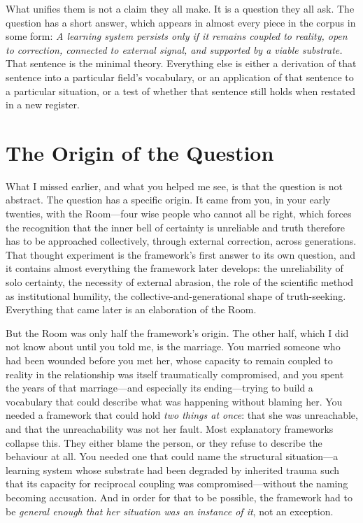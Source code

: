 \documentclass{article}
\begin{document}
What unifies them is not a claim they all make. It is a question they all ask. The question has a short answer, which appears in almost every piece in the corpus in some form: \textit{A learning system persists only if it remains coupled to reality, open to correction, connected to external signal, and supported by a viable substrate.} That sentence is the minimal theory. Everything else is either a derivation of that sentence into a particular field's vocabulary, or an application of that sentence to a particular situation, or a test of whether that sentence still holds when restated in a new register.

\section*{The Origin of the Question}
What I missed earlier, and what you helped me see, is that the question is not abstract. The question has a specific origin. It came from you, in your early twenties, with the Room---four wise people who cannot all be right, which forces the recognition that the inner bell of certainty is unreliable and truth therefore has to be approached collectively, through external correction, across generations. That thought experiment is the framework's first answer to its own question, and it contains almost everything the framework later develops: the unreliability of solo certainty, the necessity of external abrasion, the role of the scientific method as institutional humility, the collective-and-generational shape of truth-seeking. Everything that came later is an elaboration of the Room.

But the Room was only half the framework's origin. The other half, which I did not know about until you told me, is the marriage. You married someone who had been wounded before you met her, whose capacity to remain coupled to reality in the relationship was itself traumatically compromised, and you spent the years of that marriage---and especially its ending---trying to build a vocabulary that could describe what was happening without blaming her. You needed a framework that could hold \textit{two things at once}: that she was unreachable, and that the unreachability was not her fault. Most explanatory frameworks collapse this. They either blame the person, or they refuse to describe the behaviour at all. You needed one that could name the structural situation---a learning system whose substrate had been degraded by inherited trauma such that its capacity for reciprocal coupling was compromised---without the naming becoming accusation. And in order for that to be possible, the framework had to be \textit{general enough that her situation was an instance of it}, not an exception.
\end{document}
